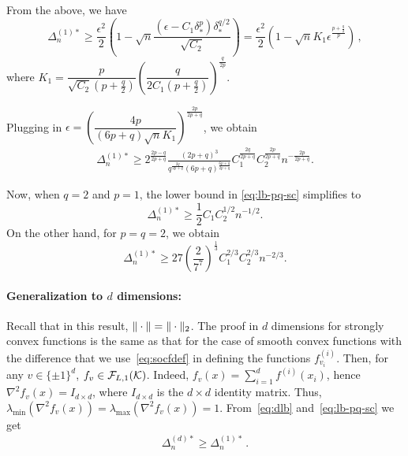From the above, we have 
\[
\Delta_n^{(1)*} \ge \dfrac{\epsilon^2}{2} \left(1 - \sqrt{
    n}  \dfrac{ (\epsilon-C_1\delta_*^p)\delta_*^{q/2}}{\sqrt{C_2}}
  \right)= \dfrac{\epsilon^2}{2} \left(1 - \sqrt{n}  K_1 \epsilon^{\frac{p+\tfrac{q}{2}}{p}}\right)\,, 
\]
 where $K_1 = \dfrac{p}{\sqrt{C_2}(p+\tfrac{q}{2})} \left(\dfrac{q}{2C_1(p+\tfrac{q}{2})}\right)^{\frac{q}{2p}}$.

Plugging in $\epsilon = \left(\dfrac{4p}{(6p+q)\sqrt{n} K_1} \right)^{\frac{2p}{2p+q}}$, we obtain
\begin{align}
\Delta_n^{(1)*} \ge 2^{\frac{2p-q}{2p+q}} \frac{(2p+q)^3}{q^{\frac{2q}{2p+q}}(6p+q)^{\frac{6p+q}{2p+q}}}  C_1^{\frac{2q}{2p+q}}C_2^{\frac{2p}{2p+q}} n^{-\frac{2p}{2p+q}}.
\label{eq:lb-pq-sc}
\end{align}

Now, when $q=2$ and $p=1$, the lower bound in \eqref{eq:lb-pq-sc} simplifies to
\[
\Delta_n^{(1)*} \ge \frac{1}{2} C_1 C_2^{1/2} n^{-1/2}.
\]
On the other hand, for $p=q=2$, we obtain
\[
\Delta_n^{(1)*} \ge 27\left(\frac{2}{7^7}\right)^{\frac{1}{3}} C_1^{2/3}C_2^{2/3} n^{-2/3} .
\]



\paragraph{Generalization to $d$ dimensions:}
Recall that in this result, $\|\cdot\| = \|\cdot\|_2$.
The proof in $d$ dimensions for strongly convex functions is the same as that for the case of smooth convex functions
with the difference that we use~\eqref{eq:socfdef} in defining the functions $f^{(i)}_{v_i}$.
Then, for any $v\in \{\pm 1 \}^d$, $f_v\in \mathcal{F}_{L,1}(\mathcal{K})$. Indeed, $f_v(x) = \sum_{i=1}^d f^{(i)}(x_i)$,
hence $\nabla^2 f_v(x) =  I_{d\times d}$, where $I_{d\times d}$ is the $d\times d$ identity matrix.
Thus, $\lambda_{\min}(\nabla^2 f_v(x)) = \lambda_{\max}(\nabla^2 f_v(x)) = 1$.
From~\eqref{eq:dlb} and~\eqref{eq:lb-pq-sc} we get
\begin{align}
\Delta_n^{(d)*} \ge \Delta_n^{(1)*} \,.
\label{eq:lb-pq-d}
\end{align}

